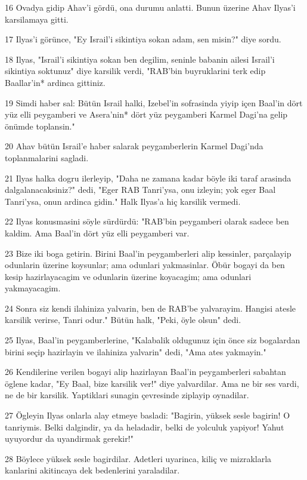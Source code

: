 \par 16 Ovadya gidip Ahav'i gördü, ona durumu anlatti. Bunun üzerine Ahav Ilyas'i karsilamaya gitti.
\par 17 Ilyas'i görünce, "Ey Israil'i sikintiya sokan adam, sen misin?" diye sordu.
\par 18 Ilyas, "Israil'i sikintiya sokan ben degilim, seninle babanin ailesi Israil'i sikintiya soktunuz" diye karsilik verdi, "RAB'bin buyruklarini terk edip Baallar'in* ardinca gittiniz.
\par 19 Simdi haber sal: Bütün Israil halki, Izebel'in sofrasinda yiyip içen Baal'in dört yüz elli peygamberi ve Asera'nin* dört yüz peygamberi Karmel Dagi'na gelip önümde toplansin."
\par 20 Ahav bütün Israil'e haber salarak peygamberlerin Karmel Dagi'nda toplanmalarini sagladi.
\par 21 Ilyas halka dogru ilerleyip, "Daha ne zamana kadar böyle iki taraf arasinda dalgalanacaksiniz?" dedi, "Eger RAB Tanri'ysa, onu izleyin; yok eger Baal Tanri'ysa, onun ardinca gidin." Halk Ilyas'a hiç karsilik vermedi.
\par 22 Ilyas konusmasini söyle sürdürdü: "RAB'bin peygamberi olarak sadece ben kaldim. Ama Baal'in dört yüz elli peygamberi var.
\par 23 Bize iki boga getirin. Birini Baal'in peygamberleri alip kessinler, parçalayip odunlarin üzerine koysunlar; ama odunlari yakmasinlar. Öbür bogayi da ben kesip hazirlayacagim ve odunlarin üzerine koyacagim; ama odunlari yakmayacagim.
\par 24 Sonra siz kendi ilahiniza yalvarin, ben de RAB'be yalvarayim. Hangisi atesle karsilik verirse, Tanri odur." Bütün halk, "Peki, öyle olsun" dedi.
\par 25 Ilyas, Baal'in peygamberlerine, "Kalabalik oldugunuz için önce siz bogalardan birini seçip hazirlayin ve ilahiniza yalvarin" dedi, "Ama ates yakmayin."
\par 26 Kendilerine verilen bogayi alip hazirlayan Baal'in peygamberleri sabahtan öglene kadar, "Ey Baal, bize karsilik ver!" diye yalvardilar. Ama ne bir ses vardi, ne de bir karsilik. Yaptiklari sunagin çevresinde ziplayip oynadilar.
\par 27 Ögleyin Ilyas onlarla alay etmeye basladi: "Bagirin, yüksek sesle bagirin! O tanriymis. Belki dalgindir, ya da heladadir, belki de yolculuk yapiyor! Yahut uyuyordur da uyandirmak gerekir!"
\par 28 Böylece yüksek sesle bagirdilar. Adetleri uyarinca, kiliç ve mizraklarla kanlarini akitincaya dek bedenlerini yaraladilar.

